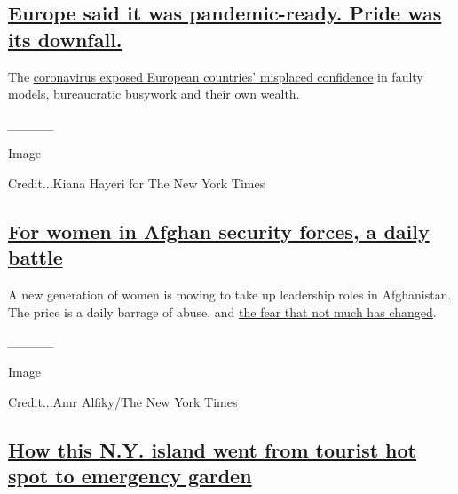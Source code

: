 \hypertarget{europe-said-it-was-pandemic-ready-pride-was-its-downfall}{%
\subsection{\texorpdfstring{\href{https://www.nytimes3xbfgragh.onion/2020/07/20/world/europe/coronavirus-mistakes-france-uk-italy.html}{Europe
said it was pandemic-ready. Pride was its
downfall.}}{Europe said it was pandemic-ready. Pride was its downfall.}}\label{europe-said-it-was-pandemic-ready-pride-was-its-downfall}}

The
\href{https://www.nytimes3xbfgragh.onion/2020/07/20/world/europe/coronavirus-mistakes-france-uk-italy.html}{coronavirus
exposed European countries' misplaced confidence} in faulty models,
bureaucratic busywork and their own wealth.

\emph{\_\_\_\_\_}

Image

Credit...Kiana Hayeri for The New York Times

\hypertarget{for-women-in-afghan-security-forces-a-daily-battle}{%
\subsection{\texorpdfstring{\href{https://www.nytimes3xbfgragh.onion/2020/07/20/world/asia/afghanistan-women-police.html}{For
women in Afghan security forces, a daily
battle}}{For women in Afghan security forces, a daily battle}}\label{for-women-in-afghan-security-forces-a-daily-battle}}

A new generation of women is moving to take up leadership roles in
Afghanistan. The price is a daily barrage of abuse, and
\href{https://www.nytimes3xbfgragh.onion/2020/07/20/world/asia/afghanistan-women-police.html}{the
fear that not much has changed}.

\emph{\_\_\_\_\_}

Image

Credit...Amr Alfiky/The New York Times

\hypertarget{how-this-ny-island-went-from-tourist-hot-spot-to-emergency-garden}{%
\subsection{\texorpdfstring{\href{https://www.nytimes3xbfgragh.onion/2020/07/23/nyregion/governors-island-nyc-urban-farm.html}{How
this N.Y. island went from tourist hot spot to emergency
garden}}{How this N.Y. island went from tourist hot spot to emergency garden}}\label{how-this-ny-island-went-from-tourist-hot-spot-to-emergency-garden}}


